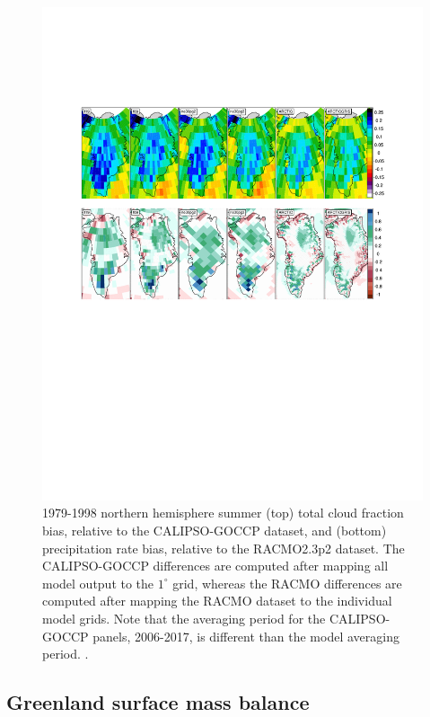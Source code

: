 \documentclass[draft]{agujournal2019}
\begin{document}
\begin{figure}[t]
\begin{center}
         \includegraphics[width=130mm]{figs/temp_contours_diffCERESdiffRACMO_CLOUD_PRECIP.pdf}
\end{center}
\caption{1979-1998 northern hemisphere summer (top) total cloud fraction bias, relative to the CALIPSO-GOCCP dataset, and (bottom) precipitation rate bias, relative to the RACMO2.3p2 dataset. The CALIPSO-GOCCP differences are computed after mapping all model output to the $1^{\circ}$ grid, whereas the RACMO differences are computed after mapping the RACMO dataset to the individual model grids. Note that the averaging period for the CALIPSO-GOCCP panels, 2006-2017, is different than the model averaging period. \color{red}{ARH - still trying to fix the layout of this figure so the label bars aren't on top of the panels}.}
\label{fig:prect}
\end{figure}

\subsection{Greenland surface mass balance}
\end{document}
